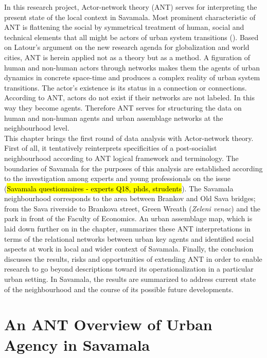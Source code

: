 \documentclass[11pt]{report}
\begin{document}
In this research project, Actor-network theory (ANT) serves for interpreting the present state of the local context in Savamala.
Most prominent characteristic of ANT is flattening the social by symmetrical treatment of human, social and technical elements that all might be actors of urban system transitions (\cite{Latour, 2005}). 
Based on Latour’s argument on the new research agenda for globalization and world cities, ANT is herein applied not as a theory but as a method.
A figuration of human and non-human actors through networks makes them the agents of urban dynamics in concrete space-time and produces a complex reality of urban system transitions. 
The actor’s existence is its status in a connection or connections.
According to ANT, actors do not exist if their networks are not labeled.
In this way they become agents.
Therefore ANT serves for structuring the data on human and non-human agents and urban assemblage networks at the neighbourhood level.
\\

This chapter brings the first round of data analysis with Actor-network theory.
First of all, it tentatively reinterprets specificities of a post-socialist neighbourhood according to ANT logical framework and terminology. 
The boundaries of Savamala for the purposes of this analysis are established according to the investigation among experts and young professionals on the issue (\hl{Savamala questionnaires - experts Q18, phds, strudents}).
The Savamala neighbourhood corresponds to the area between Brankov and Old Sava bridges; from the Sava riverside to Brankova street, Green Wreath (\textit{Zeleni venac}) and the park in front of the Faculty of Economics.
An urban assemblage map, which is laid down further on in the chapter, summarizes these ANT interpretations in terms of the relational networks between urban key agents and identified social aspects at work in local and wider context of Savamala.
Finally, the conclusion discusses the results, risks and opportunities of extending ANT in order to enable research to go beyond descriptions toward its operationalization in a particular urban setting.
In Savamala, the results are summarized to address current state of the neighbourhood and the course of its possible future developments.

\section{An ANT Overview of Urban Agency in Savamala}
\end{document}

